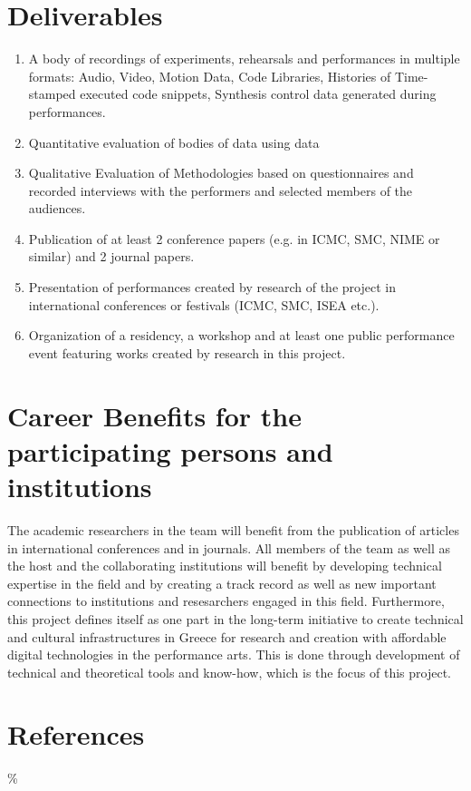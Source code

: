 \section{Deliverables}
\label{sec:orgde1de8e}
\begin{enumerate}
\item A body of recordings of experiments, rehearsals and performances in multiple formats: Audio, Video, Motion Data, Code Libraries, Histories of Time-stamped executed code snippets, Synthesis control data generated during performances.
\item Quantitative evaluation of bodies of data using data
\item Qualitative Evaluation of Methodologies based on questionnaires and recorded interviews with the performers and selected members of the audiences.
\item Publication of at least 2 conference papers (e.g. in ICMC, SMC, NIME or similar) and 2 journal papers.
\item Presentation of performances created by research of the project in international conferences or festivals (ICMC, SMC, ISEA etc.).
\item Organization of a residency, a workshop and at least one public performance event featuring works created by research in this project.
\end{enumerate}

\section{Career Benefits for the participating persons and institutions}
\label{sec:org8ddf1f7}
The academic researchers in the team will benefit from the publication of articles in international conferences and in journals.  All members of the team as well as the host and the collaborating institutions will benefit by developing technical expertise in the field and by creating a track record as well as new important connections to institutions and resesarchers engaged in this field.  Furthermore, this project defines itself as one part in the long-term initiative to create technical and cultural infrastructures in Greece for research and creation with affordable digital technologies in the performance arts.  This is done through development of technical and theoretical tools and know-how, which is the focus of this project.

\section{References}
\label{sec:orgc1d58cd}
\setlength{\parindent}{-0.2in}
\setlength{\leftskip}{0.2in}
\% \setlength{\parskip}{8pt}
\setlength{\parskip}{0.1cm plus 4mm minus 3mm}
\noindent

